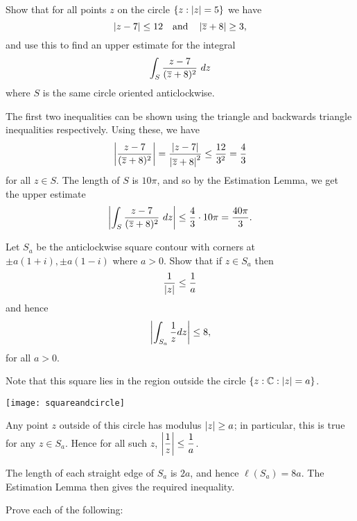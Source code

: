 \begin{questions}
\begin{answer}
\end{answer}


\question Show that for all points $z$ on the circle $\left\{z: \left| z \right|=5\right\}$ we have
\[
\left| z-7 \right| \leq 12 \quad \text{and}\quad \left| \overline{z}+8 \right| \geq 3,
\]
and use this to find an upper estimate for the integral
\[
\int_S \frac{z-7}{(\overline{z}+8)^2}\ dz
\]
where $S$ is the same circle oriented anticlockwise.

\begin{answer}
The first two inequalities can be shown using the triangle and backwards triangle inequalities respectively.  Using these, we have 
\[
\left| \frac{z-7}{(\overline{z}+8)^2} \right| = \frac{\left| z-7 \right|}{\left| \overline{z}+8 \right|^2} \leq \frac{12}{3^2} = \frac{4}{3}
\]
for all $z \in S$.  The length of $S$ is $10\pi$, and so by the Estimation Lemma, we get the upper estimate
\[
\left| 
\int_S \frac{z-7}{(\overline{z}+8)^2}\ dz
 \right|
\leq \frac{4}{3} \cdot 10\pi = \frac{40\pi}{3}.
\]
\end{answer}

\question Let $S_a$ be the anticlockwise square contour with corners at $\pm a(1+i),\pm a(1-i)$ where $a>0$.  Show that if $z \in S_a$ then
\[
\frac{1}{\left| z \right|} \leq \frac{1}{a} \]
and hence
\[ \left|  \int_{S_a} \frac{1}{z} dz  \right| \leq 8,
\]
for all $a>0$.

\begin{answer}
Note that this square lies in the region outside the circle $\left\{z:\mathbb{C}: \left| z \right|=a\right\}$.
\begin{center}
\texttt{[image: squareandcircle]}
\end{center}
Any point $z$ outside of this circle has modulus $\left| z \right| \geq a$; in particular, this is true for any $z \in S_a$.  Hence for all such $z$, $\left| \dfrac{1}{z} \right| \leq \dfrac{1}{a}$.

The length of each straight edge of $S_a$ is $2a$, and hence $\ell (S_a) = 8a$.  The Estimation Lemma then gives the required inequality.
\end{answer}

\question Prove each of the following:
\end{questions}
